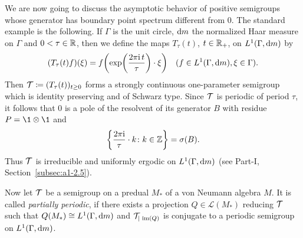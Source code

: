 We are now going to discuss the asymptotic behavior of positive semigroups whose generator has boundary point spectrum different from $ 0 $.
The standard example is the following.
If\/ $\Gamma$  is the unit circle, $ \mathop{}\!\mathrm{d}{m} $  the normalized Haar measure on $\Gamma$  and $ 0 < \tau \in \mathbb{R} $, then we define the maps $ T_{\tau}(t) $, $ t \in \mathbb{R}_{+} $, on $ L^{1}(\Gamma, \mathop{}\!\mathrm{d}{m}) $  by
\[
(T_{\tau}(t)f)(\xi) = f\mleft( \exp\mleft(\frac{2\pi \iu  \, t }{\tau} \mright) \cdot \xi \mright) \quad (f \in L^{1}(\Gamma ,\dm), \xi \in \Gamma).
\]
%
%
Then $ \TT \coloneqq (T_{\tau}(t))_{t \geq 0} $  forms a strongly continuous one-parameter semigroup which is identity preserving and of Schwarz type.
Since $ \mathcal{T} $  is periodic of period $ \tau $, it follows that 0 is a pole of the resolvent of its generator $ B $  with residue $ P = \1 \otimes \1 $  and %
\[
	\left\{\frac{2\pi \mathrm{i}}{\tau} \cdot k \colon k \in \mathbb{Z} \right\} = \sigma(B) .
\]
%
Thus $ \mathcal{T} $  is irreducible and uniformly ergodic on $ L^{1}(\Gamma ,\mathop{}\!\mathrm{d}{m}) $  
(see Part-I, Section~\ref{subsec:a1-2.5}).

Now let $ \mathcal{T} $  be a semigroup on a predual $ M_{*} $ of a von Neumann algebra $ M $.
It is called \emph{partially periodic}, if there exists a projection $ Q \in \mathcal{L}(M_{*}) $  reducing $ \mathcal{T} $  such that $ Q(M_{*}) \cong L^{1}(\Gamma,\mathop{}\!\mathrm{d}{m}) $  and $ \mathcal{T}_{| \mathop{}\mathrm{im}(Q)} $  is conjugate to a periodic semigroup on $ L^{1}(\Gamma ,\mathop{}\!\mathrm{d}{m}) $.

